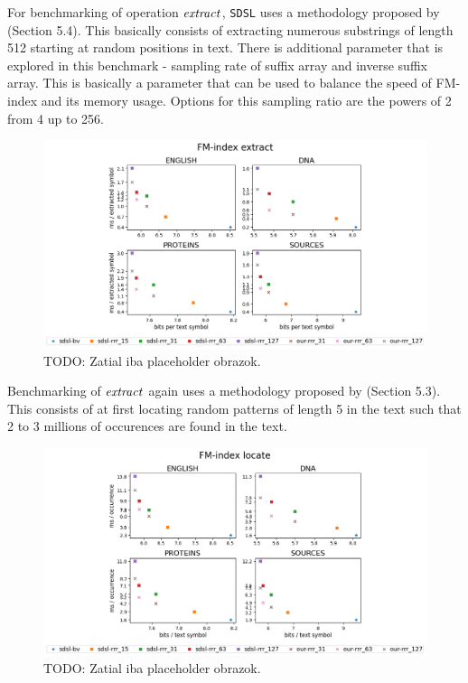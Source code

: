 For benchmarking of operation $\mathit{extract}$, \texttt{SDSL} uses a methodology proposed by
\cite{ferragina2009compressed} (Section 5.4). This basically consists of extracting numerous
substrings of length 512 starting at random positions in text. There is additional parameter
that is explored in this benchmark - sampling rate of suffix array and inverse suffix array.
This is basically a parameter that can be used to balance the speed of FM-index and its memory
usage. Options for this sampling ratio are the powers of 2 from 4 up to 256. 

\begin{figure}
	\centerline{
		\includegraphics[width=\textwidth, height=0.7\textheight]{images/vysledky_sdsl_extract}
	}
	\caption[TODO]{TODO: Zatial iba placeholder obrazok.
	}
	\label{obr:benchmark_sdsl_extract}
\end{figure}

Benchmarking of $\mathit{extract}$ again uses a methodology proposed by \cite{ferragina2009compressed} 
(Section 5.3). This consists of at first locating random patterns of length 5 in the text such
that 2 to 3 millions of occurences are found in the text.

\begin{figure}
	\centerline{
		\includegraphics[width=\textwidth, height=0.7\textheight]{images/vysledky_sdsl_locate}
	}
	\caption[TODO]{TODO: Zatial iba placeholder obrazok.
	}
	\label{obr:benchmark_sdsl_locate}
\end{figure}

